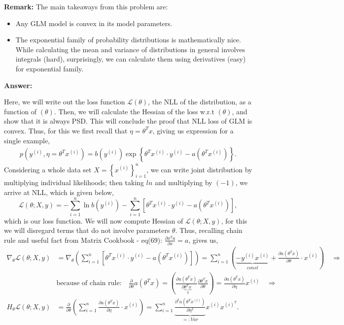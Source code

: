 \documentclass{article}
\begin{document}
\begin{enumerate}[label=\alph*)]
\textbf{Remark:} The main takeaways from this problem are:
\begin{itemize}
  \item Any GLM model is convex in its model parameters.
  \item The exponential family of probability distributions is mathematically nice. While calculating the mean and variance of distributions in general involves integrals (hard), surprisingly, we can calculate them using derivatives (easy) for exponential family.
\end{itemize}

\textbf{Answer:}

Here, we will write out the loss function $\mathscr{L}(\theta)$, the NLL of the distribution, as a function
of $(\theta)$. Then, we will calculate the Hessian of the loss w.r.t $(\theta)$, and show that it is always PSD. This will
conclude the proof that NLL loss of GLM is convex. Thus, for this we first recall that $\eta =\theta^Tx$, giving us expression for a single example,
\begin{align*}
    p(y^{(i)},\eta = \theta^Tx^{(i)}) = b(y^{(i)})\exp\left\{\theta^Tx^{(i)}\cdot y^{(i)} - a(\theta^Tx^{(i)})\right\}.
\end{align*}
Considering a whole data set $X=\left\{x^{(i)}\right\}_{i=1}^{n}$, we can write joint distribution by multiplying individual likelihoods; then taking $ln$ and multiplying by $(-1)$, we arrive at NLL, which is given below,
\begin{equation*}
\boxed{\mathscr{L}(\theta;X,y) = - \sum_{i=1}^{n} \ln b(y^{(i)})-\sum_{i=1}^{n} \left[\theta^T x^{(i)} \cdot y^{(i)}- a(\theta^T x^{(i)})\right],}
\end{equation*}
which is our loss function. We will now compute Hessian of $\mathscr{L}(\theta;X,y)$, for this we will disregard terms that do not involve parameters $\theta$. Thus, recalling chain rule and useful fact from Matrix Cookbook - eq(69): $\frac{\partial x^Ta}{\partial x} = a$, gives us, 
\begin{align*}
   \nabla_\theta \mathscr{L}(\theta;X,y) &= \nabla_\theta \left(\sum_{i=1}^{n} \left[\theta^T x^{(i)} \cdot y^{(i)}- a(\theta^T x^{(i)})\right]\right) = \sum_{i=1}^{n}\left(\underbrace{-y^{(i)}x^{(i)}}_{const}+\frac{\partial a(\theta^Tx)}{\partial\theta}\cdot x^{(i)}\right) \quad\Rightarrow \\[8pt]
  & \mbox{because of chain rule:}\quad
\frac{\partial}{\partial \theta} a(\theta^T x) = \left(  \frac{\partial a(\theta^T x)}{\partial \underbrace{\theta^Tx}_{\eta}} \frac{\partial \theta^Tx}{\partial \theta} \right) = \frac{\partial a(\theta^T x)}{\partial \eta} x^{(i)} \quad\Rightarrow
\\[8pt]
   H_\theta \mathscr{L}(\theta;X,y)& = \frac{\partial}{\partial \theta}\left(\sum_{i=1}^{n} \frac{\partial a(\theta^Tx)}{\partial\eta}\cdot x^{(i)}\right) = \sum_{i=1}^{n}\underbrace{\frac{\partial^2 a(\theta^Tx^{(i)})}{\partial \eta^2}}_{=:Var}x^{(i)}x^{(i)^{T}}.
\end{align*}



\end{enumerate}
\end{document}
